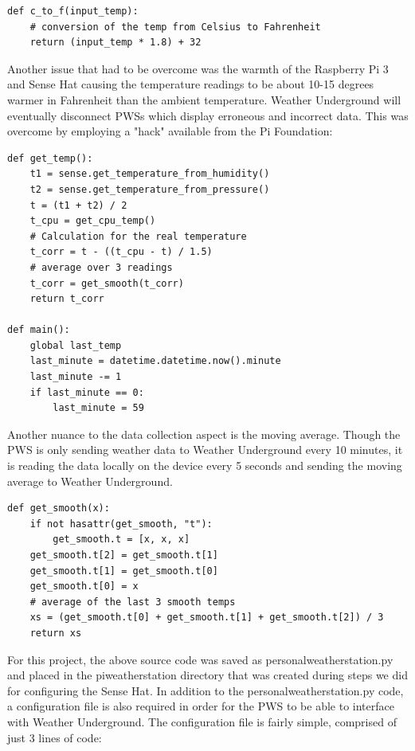 \documentclass[sigconf]{acmart}
\begin{document}
\begin{verbatim}
def c_to_f(input_temp):
    # conversion of the temp from Celsius to Fahrenheit
    return (input_temp * 1.8) + 32
\end{verbatim}


Another issue that had to be overcome was the warmth of the Raspberry Pi 3 and Sense Hat causing the temperature readings to be about 10-15 degrees warmer in Fahrenheit than the ambient temperature. Weather Underground will eventually disconnect PWSs which display erroneous and incorrect data. This was overcome by employing a "hack" available from the Pi Foundation\cite{PiFoundationHack2017}:

\begin{verbatim}
def get_temp():
    t1 = sense.get_temperature_from_humidity()
    t2 = sense.get_temperature_from_pressure()
    t = (t1 + t2) / 2
    t_cpu = get_cpu_temp()
    # Calculation for the real temperature 
    t_corr = t - ((t_cpu - t) / 1.5)
    # average over 3 readings
    t_corr = get_smooth(t_corr)
    return t_corr

def main():
    global last_temp
    last_minute = datetime.datetime.now().minute
    last_minute -= 1
    if last_minute == 0:
        last_minute = 59
\end{verbatim}


Another nuance to the data collection aspect is the moving average. Though the PWS is only sending weather data to Weather Underground every 10 minutes, it is reading the data locally on the device every 5 seconds and sending the moving average to Weather Underground. 


\begin{verbatim}
def get_smooth(x):
    if not hasattr(get_smooth, "t"):
        get_smooth.t = [x, x, x]
    get_smooth.t[2] = get_smooth.t[1]
    get_smooth.t[1] = get_smooth.t[0]
    get_smooth.t[0] = x
    # average of the last 3 smooth temps
    xs = (get_smooth.t[0] + get_smooth.t[1] + get_smooth.t[2]) / 3
    return xs
\end{verbatim}


For this project, the above source code was saved as personal\textunderscore weather\textunderscore station.py and placed in the pi\textunderscore weather\textunderscore station directory that was created during steps we did for configuring the Sense Hat. In addition to the personal\textunderscore weather\textunderscore station.py code, a configuration file is also required in order for the PWS to be able to interface with Weather Underground. The configuration file is fairly simple, comprised of just 3 lines of code:
\end{document}
